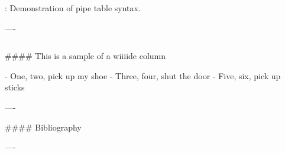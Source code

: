 \documentclass{beamer}
\begin{document}
\begin{frame}[fragile]
\begin{columns}[T]
\begin{column}{.46\textwidth}
\begin{markdown}
  : Demonstration of pipe table syntax.

----

\end{markdown}
\end{column}
\end{columns}

\begin{markdown}

#### This is a sample of a wiiiide column

- One, two, pick up my shoe
- Three, four, shut the door
- Five, six, pick up sticks

----

#### Bibliography




----

\end{markdown}

\end{frame}
\end{document}
